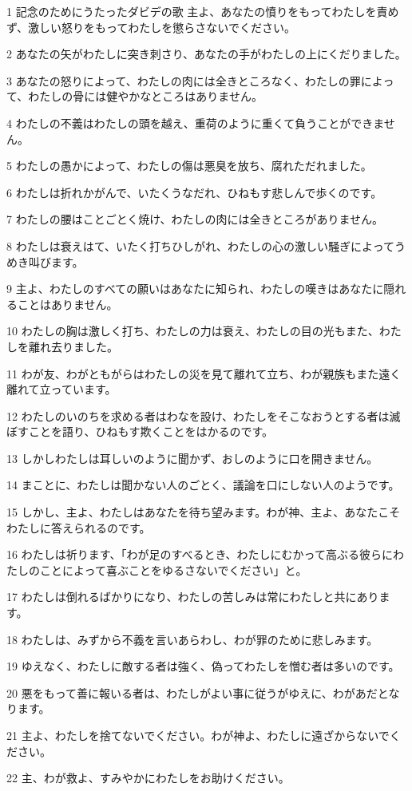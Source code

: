 \par 1 記念のためにうたったダビデの歌 主よ、あなたの憤りをもってわたしを責めず、激しい怒りをもってわたしを懲らさないでください。
\par 2 あなたの矢がわたしに突き刺さり、あなたの手がわたしの上にくだりました。
\par 3 あなたの怒りによって、わたしの肉には全きところなく、わたしの罪によって、わたしの骨には健やかなところはありません。
\par 4 わたしの不義はわたしの頭を越え、重荷のように重くて負うことができません。
\par 5 わたしの愚かによって、わたしの傷は悪臭を放ち、腐れただれました。
\par 6 わたしは折れかがんで、いたくうなだれ、ひねもす悲しんで歩くのです。
\par 7 わたしの腰はことごとく焼け、わたしの肉には全きところがありません。
\par 8 わたしは衰えはて、いたく打ちひしがれ、わたしの心の激しい騒ぎによってうめき叫びます。
\par 9 主よ、わたしのすべての願いはあなたに知られ、わたしの嘆きはあなたに隠れることはありません。
\par 10 わたしの胸は激しく打ち、わたしの力は衰え、わたしの目の光もまた、わたしを離れ去りました。
\par 11 わが友、わがともがらはわたしの災を見て離れて立ち、わが親族もまた遠く離れて立っています。
\par 12 わたしのいのちを求める者はわなを設け、わたしをそこなおうとする者は滅ぼすことを語り、ひねもす欺くことをはかるのです。
\par 13 しかしわたしは耳しいのように聞かず、おしのように口を開きません。
\par 14 まことに、わたしは聞かない人のごとく、議論を口にしない人のようです。
\par 15 しかし、主よ、わたしはあなたを待ち望みます。わが神、主よ、あなたこそわたしに答えられるのです。
\par 16 わたしは祈ります、「わが足のすべるとき、わたしにむかって高ぶる彼らにわたしのことによって喜ぶことをゆるさないでください」と。
\par 17 わたしは倒れるばかりになり、わたしの苦しみは常にわたしと共にあります。
\par 18 わたしは、みずから不義を言いあらわし、わが罪のために悲しみます。
\par 19 ゆえなく、わたしに敵する者は強く、偽ってわたしを憎む者は多いのです。
\par 20 悪をもって善に報いる者は、わたしがよい事に従うがゆえに、わがあだとなります。
\par 21 主よ、わたしを捨てないでください。わが神よ、わたしに遠ざからないでください。
\par 22 主、わが救よ、すみやかにわたしをお助けください。

